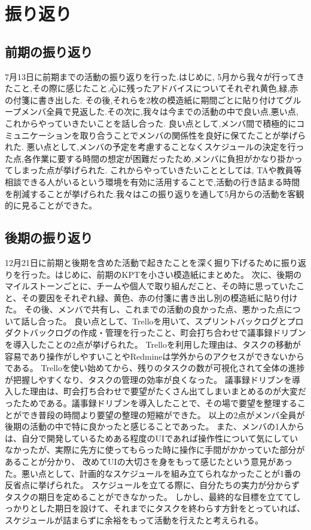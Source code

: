 \chapter{振り返り}

\section{前期の振り返り}
7月13日に前期までの活動の振り返りを行った.はじめに, 5月から我々が行ってきたこと,その際に感じたこと,心に残ったアドバイスについてそれぞれ黄色,緑,赤の付箋に書き出した.
その後,それらを2枚の模造紙に期間ごとに貼り付けてグループメンバ全員で見返した.その次に,我々は今までの活動の中で良い点,悪い点,これからやっていきたいことを話し合った.
良い点として,メンバ間で積極的にコミュニケーションを取り合うことでメンバの関係性を良好に保てたことが挙げられた.
悪い点として,メンバの予定を考慮することなくスケジュールの決定を行った点,各作業に要する時間の想定が困難だったため,メンバに負担がかなり掛かってしまった点が挙げられた.
これからやっていきたいこととしては, TAや教員等相談できる人がいるという環境を有効に活用することで,活動の行き詰まる時間を削減することが挙げられた.我々はこの振り返りを通して5月からの活動を客観的に見ることができた。

\section{後期の振り返り}
12月21日に前期と後期を含めた活動で起きたことを深く掘り下げるために振り返りを行った。はじめに、前期のKPTを小さい模造紙にまとめた。
次に、後期のマイルストーンごとに、チームや個人で取り組んだこと、その時に思っていたこと、その要因をそれぞれ緑、黄色、赤の付箋に書き出し別の模造紙に貼り付けた。
その後、メンバで共有し、これまでの活動の良かった点、悪かった点について話し合った。
良い点として、Trelloを用いて、スプリントバックログとプロダクトバックログの作成・管理を行ったこと、町会打ち合わせで議事録ドリブンを導入したことの2点が挙げられた。
Trelloを利用した理由は、タスクの移動が容易であり操作がしやすいことやRedmineは学外からのアクセスができないからである。
Trelloを使い始めてから、残りのタスクの数が可視化されて全体の進捗が把握しやすくなり、タスクの管理の効率が良くなった。
議事録ドリブンを導入した理由は、町会打ち合わせで要望がたくさん出てしまいまとめるのが大変だったためである。議事録ドリブンを導入したことで、その場で要望を整理することができ普段の時間より要望の整理の短縮ができた。
以上の2点がメンバ全員が後期の活動の中で特に良かったと感じることであった。
また、メンバの1人からは、自分で開発しているためある程度のUIであれば操作性について気にしていなかったが、実際に先方に使ってもらった時に操作に手間がかかっていた部分があることが分かり、
改めてUIの大切さを身をもって感じたという意見があった。悪い点として、計画的なスケジュールを組み立てられなかったことが1番の反省点に挙げられた。
スケジュールを立てる際に、自分たちの実力が分からずタスクの期日を定めることができなかった。
しかし、最終的な目標を立ててしっかりとした期日を設けて、それまでにタスクを終わらす方針をとっていれば、スケジュールが詰まらずに余裕をもって活動を行えたと考えられる。

